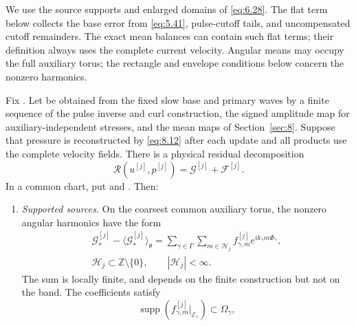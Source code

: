 We use the source supports  and enlarged domains
 of \eqref{eq:6.28}. The flat term below collects the base
error  from \eqref{eq:5.41}, pulse-cutoff tails, and uncompensated
cutoff remainders. The exact mean balances can contain such flat terms; their definition always uses
the complete current velocity. Angular means may occupy the full auxiliary torus; the rectangle and
envelope conditions below concern the nonzero harmonics.

\begin{proposition}\label{prop:9.3}
Fix . Let
 be obtained from the fixed slow base and primary waves by a
finite sequence of the pulse inverse and curl construction, the signed amplitude map for
auxiliary-independent stresses, and the mean maps of Section~\ref{sec:8}. Suppose that pressure is
reconstructed by \eqref{eq:8.12} after each update and all products use the complete velocity fields.
There is a physical residual decomposition
\begin{equation}
\mathscr R(u^{[j]},p^{[j]})=\mathcal G^{[j]}+\mathcal F^{[j]}.
\tag{9.3}\label{eq:9.3}
\end{equation}
In a common chart, put
 and
. Then:
\begin{enumerate}[label=(\roman*)]
\item \emph{Supported sources.} On the coarsest common auxiliary torus, the nonzero angular
harmonics have the form
\begin{equation}
\begin{gathered}
\mathcal G_*^{[j]}-\langle\mathcal G_*^{[j]}\rangle_\theta
 =\sum_{\gamma\in\Gamma}\sum_{m\in\mathscr H_j}
 f_{\gamma,m}^{[j]}e^{ik_\gamma m\Phi_\gamma},\\
\mathscr H_j\subset\mathbb Z\setminus\{0\},\qquad |\mathscr H_j|<\infty.
\end{gathered}
\tag{9.4}\label{eq:9.4}
\end{equation}
The sum is locally finite, and  depends on the finite construction
but not on the band. The coefficients satisfy
\[
\operatorname{supp}(f_{\gamma,m}^{[j]}|_{\mathcal E_\gamma})\subset\Omega_\gamma,
\]
\end{enumerate}
\end{proposition}
